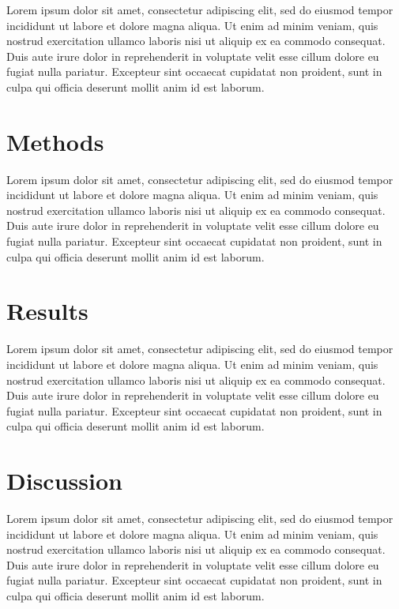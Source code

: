 \documentclass[nogrid]{MBE}%
\begin{document}
Lorem ipsum dolor sit amet, consectetur adipiscing elit, sed do eiusmod tempor incididunt ut labore et dolore magna aliqua. Ut enim ad minim veniam, quis nostrud exercitation ullamco laboris nisi ut aliquip ex ea commodo consequat. Duis aute irure dolor in reprehenderit in voluptate velit esse cillum dolore eu fugiat nulla pariatur. Excepteur sint occaecat cupidatat non proident, sunt in culpa qui officia deserunt mollit anim id est laborum.

\section{{Methods}\label{sec:Methods}}

Lorem ipsum dolor sit amet, consectetur adipiscing elit, sed do eiusmod tempor incididunt ut labore et dolore magna aliqua. Ut enim ad minim veniam, quis nostrud exercitation ullamco laboris nisi ut aliquip ex ea commodo consequat. Duis aute irure dolor in reprehenderit in voluptate velit esse cillum dolore eu fugiat nulla pariatur. Excepteur sint occaecat cupidatat non proident, sunt in culpa qui officia deserunt mollit anim id est laborum.

\section{{Results}\label{sec:Results}}

Lorem ipsum dolor sit amet, consectetur adipiscing elit, sed do eiusmod tempor incididunt ut labore et dolore magna aliqua. Ut enim ad minim veniam, quis nostrud exercitation ullamco laboris nisi ut aliquip ex ea commodo consequat. Duis aute irure dolor in reprehenderit in voluptate velit esse cillum dolore eu fugiat nulla pariatur. Excepteur sint occaecat cupidatat non proident, sunt in culpa qui officia deserunt mollit anim id est laborum.

\section{{Discussion}\label{sec:Discussion}}

Lorem ipsum dolor sit amet, consectetur adipiscing elit, sed do eiusmod tempor incididunt ut labore et dolore magna aliqua. Ut enim ad minim veniam, quis nostrud exercitation ullamco laboris nisi ut aliquip ex ea commodo consequat. Duis aute irure dolor in reprehenderit in voluptate velit esse cillum dolore eu fugiat nulla pariatur. Excepteur sint occaecat cupidatat non proident, sunt in culpa qui officia deserunt mollit anim id est laborum.
\end{document}
